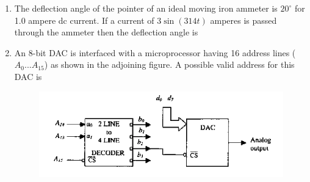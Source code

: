 \documentclass[journal,12pt,onecolumn]{IEEEtran}
\theoremstyle{remark}
\begin{document}
\begin{enumerate}
\hfill{}\begin{enumerate}  \end{enumerate}

\vspace{0.5cm}

\item The deflection angle of the pointer of an ideal moving iron ammeter is $20^\circ$ for 1.0 ampere dc current. If a current of $3 \sin(314t)$ amperes is passed through the ammeter then the deflection angle is

\hfill{}\begin{enumerate}  \end{enumerate}

\vspace{0.5cm}

\item An 8-bit DAC is interfaced with a microprocessor having 16 address lines ($A_0...A_{15}$) as shown in the adjoining figure. A possible valid address for this DAC is
\begin{figure}[h]
    \centering
    \includegraphics[scale=0.75]{q23}
    \caption*{}
    \label{fig:placeholder}
\end{figure}

\hfill{}\begin{enumerate}  
\end{enumerate}


\end{enumerate}
\end{document}
